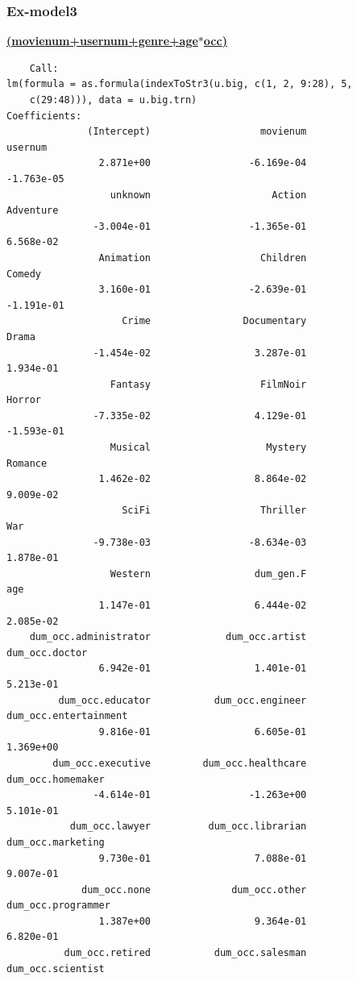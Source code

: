 \documentclass[11pt]{article}
\begin{document}
\subsubsection{Ex-model3}
\textbf{\underline{(movienum+usernum+genre+age$*$occ)}}
\begin{verbatim}
    Call:
lm(formula = as.formula(indexToStr3(u.big, c(1, 2, 9:28), 5, 
    c(29:48))), data = u.big.trn)
Coefficients:
              (Intercept)                   movienum                    usernum  
                2.871e+00                 -6.169e-04                 -1.763e-05  
                  unknown                     Action                  Adventure  
               -3.004e-01                 -1.365e-01                  6.568e-02  
                Animation                   Children                     Comedy  
                3.160e-01                 -2.639e-01                 -1.191e-01  
                    Crime                Documentary                      Drama  
               -1.454e-02                  3.287e-01                  1.934e-01  
                  Fantasy                   FilmNoir                     Horror  
               -7.335e-02                  4.129e-01                 -1.593e-01  
                  Musical                    Mystery                    Romance  
                1.462e-02                  8.864e-02                  9.009e-02  
                    SciFi                   Thriller                        War  
               -9.738e-03                 -8.634e-03                  1.878e-01  
                  Western                  dum_gen.F                        age  
                1.147e-01                  6.444e-02                  2.085e-02  
    dum_occ.administrator             dum_occ.artist             dum_occ.doctor  
                6.942e-01                  1.401e-01                  5.213e-01  
         dum_occ.educator           dum_occ.engineer      dum_occ.entertainment  
                9.816e-01                  6.605e-01                  1.369e+00  
        dum_occ.executive         dum_occ.healthcare          dum_occ.homemaker  
               -4.614e-01                 -1.263e+00                  5.101e-01  
           dum_occ.lawyer          dum_occ.librarian          dum_occ.marketing  
                9.730e-01                  7.088e-01                  9.007e-01  
             dum_occ.none              dum_occ.other         dum_occ.programmer  
                1.387e+00                  9.364e-01                  6.820e-01  
          dum_occ.retired           dum_occ.salesman          dum_occ.scientist  

\end{verbatim}
\end{document}
